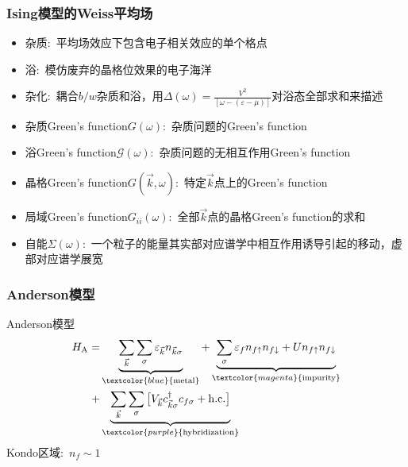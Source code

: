 \frame
{
	\frametitle{\textrm{Ising}模型的\textrm{Weiss}平均场}
	\begin{itemize}
		\item 杂质:~平均场效应下包含电子相关效应的单个格点
		\item 浴:~模仿废弃的晶格位效果的电子海洋
		\item 杂化:~耦合$b/w$杂质和浴，用$\Delta(\omega)=\frac{V^2}{[\omega-(\varepsilon-\mu)]}$对浴态全部求和来描述
		\item 杂质\textrm{Green's function}$G(\omega)$:~杂质问题的\textrm{Green's function}
		\item 浴\textrm{Green's function}$\mathcal{G}(\omega)$:~杂质问题的无相互作用\textrm{Green's function}
		\item 晶格\textrm{Green's function}$G(\vec k,\omega)$:~特定$\vec k$点上的\textrm{Green's function}
		\item 局域\textrm{Green's function}$G_{ii}(\omega)$:~全部$\vec k$点的晶格\textrm{Green's function}的求和
		\item 自能$\Sigma(\omega)$:~一个粒子的能量其实部对应谱学中相互作用诱导引起的移动，虚部对应谱学展宽
	\end{itemize}
}

\frame
{
	\frametitle{\textrm{Anderson}模型}
	\textrm{Anderson}模型
	\begin{displaymath}
		\begin{aligned}
			H_{\mathrm{A}}=&\underbrace{\sum_{\vec k}\sum_{\sigma}\varepsilon_{\vec k}n_{\vec k\sigma}}_{\textcolor{blue}{\mathrm{metal}}}+\underbrace{\sum_{\sigma}\varepsilon_fn_{f\uparrow}n_{f\downarrow}+Un_{f\uparrow}n_{f\downarrow}}_{\textcolor{magenta}{\mathrm{impurity}}}\\
			+&\underbrace{\sum_{\vec k}\sum_{\sigma}\big[V_{\vec k}c_{\vec k\sigma}^{\dag}c_{f\sigma}+\mathrm{h.c.}\big]}_{\textcolor{purple}{\mathrm{hybridization}}}
		\end{aligned}
	\end{displaymath}
	\textrm{Kondo}区域:~$n_f\sim1$

{\fontsize{8.2pt}{6.2pt}}
}

